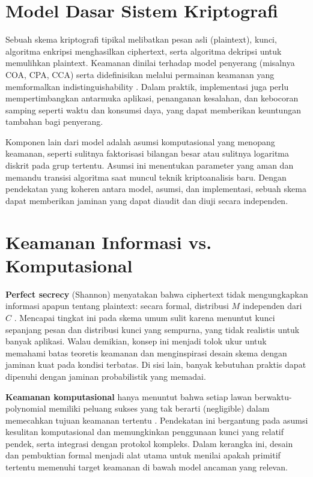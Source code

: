 \documentclass[../main.tex]{subfiles}
\begin{document}
\section{Model Dasar Sistem Kriptografi}
Sebuah skema kriptografi tipikal melibatkan pesan asli (plaintext), kunci, algoritma enkripsi menghasilkan ciphertext, serta algoritma dekripsi untuk memulihkan plaintext. Keamanan dinilai terhadap model penyerang (misalnya COA, CPA, CCA) serta didefinisikan melalui permainan keamanan yang memformalkan indistinguishability \citep{katzlindell,bonehshoup}. Dalam praktik, implementasi juga perlu mempertimbangkan antarmuka aplikasi, penanganan kesalahan, dan kebocoran samping seperti waktu dan konsumsi daya, yang dapat memberikan keuntungan tambahan bagi penyerang.

Komponen lain dari model adalah asumsi komputasional yang menopang keamanan, seperti sulitnya faktorisasi bilangan besar atau sulitnya logaritma diskrit pada grup tertentu. Asumsi ini menentukan parameter yang aman dan memandu transisi algoritma saat muncul teknik kriptoanalisis baru. Dengan pendekatan yang koheren antara model, asumsi, dan implementasi, sebuah skema dapat memberikan jaminan yang dapat diaudit dan diuji secara independen.

\section{Keamanan Informasi vs. Komputasional}
\textbf{Perfect secrecy} (Shannon) menyatakan bahwa ciphertext tidak mengungkapkan informasi apapun tentang plaintext: secara formal, distribusi \(M\) independen dari \(C\) \citep{shannon1949}. Mencapai tingkat ini pada skema umum sulit karena menuntut kunci sepanjang pesan dan distribusi kunci yang sempurna, yang tidak realistis untuk banyak aplikasi. Walau demikian, konsep ini menjadi tolok ukur untuk memahami batas teoretis keamanan dan menginspirasi desain skema dengan jaminan kuat pada kondisi terbatas. Di sisi lain, banyak kebutuhan praktis dapat dipenuhi dengan jaminan probabilistik yang memadai.

\textbf{Keamanan komputasional} hanya menuntut bahwa setiap lawan berwaktu-polynomial memiliki peluang sukses yang tak berarti (negligible) dalam memecahkan tujuan keamanan tertentu \citep{katzlindell}. Pendekatan ini bergantung pada asumsi kesulitan komputasional dan memungkinkan penggunaan kunci yang relatif pendek, serta integrasi dengan protokol kompleks. Dalam kerangka ini, desain dan pembuktian formal menjadi alat utama untuk menilai apakah primitif tertentu memenuhi target keamanan di bawah model ancaman yang relevan.
\end{document}
